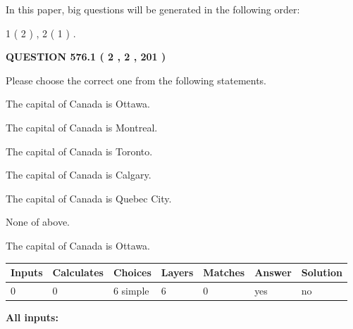\documentclass[12pt]{article}
\begin{document}
In this paper, big questions will be generated in the following order: 
   
   
   1 ( 2 )
 ,
   2 ( 1 )
 .
  
\vspace{0.2in}
  
{\textbf{\Large{QUESTION
576.1 
 ( 2 , 2 , 201 )
}}}
  
  
Please choose the correct one from the following statements.
 
 
The capital of Canada is Ottawa.
 
 
The capital of Canada is Montreal.
 
 
The capital of Canada is Toronto.
 
 
The capital of Canada is Calgary.
 
 
The capital of Canada is Quebec City.
 
 
 None of above.
 
 
\noindent{}
 
 
The capital of Canada is Ottawa.
 
 
\noindent{}
 
 
   
   
   
   
\noindent\begin{tabular}{|l|l|l|l|l|l|l|}
 \hline
Inputs & Calculates & Choices & Layers & Matches & Answer & Solution \\ \hline
 0  & 
 0  & 
 6
  simple  
  & 
 6  & 
 0  & 
  yes & 
  no 
  \\ \hline
 \end{tabular}
   
   
   
   
\noindent{}
   
   
   
   
\noindent\vspace{0.1in}\hspace{-0.08in} {\textbf{\Large{All inputs: }}}
   
   
  
\vspace{0.2in}
  
\end{document}
